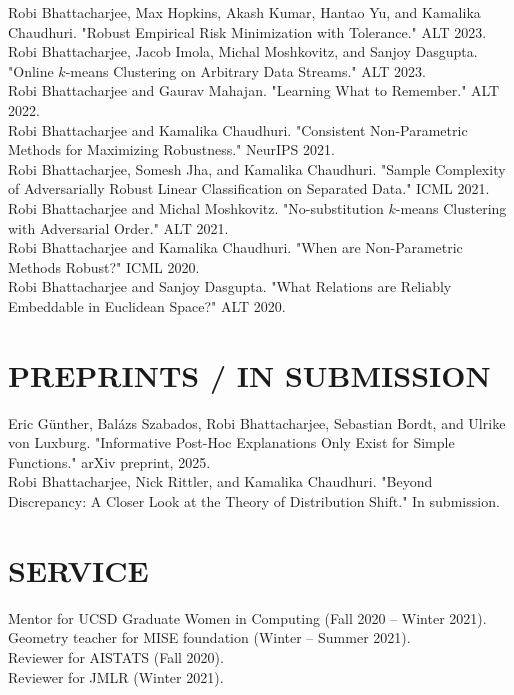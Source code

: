 \documentclass{res}
\begin{document}
\begin{resume}
Robi Bhattacharjee, Max Hopkins, Akash Kumar, Hantao Yu, and Kamalika Chaudhuri. "Robust Empirical Risk Minimization with Tolerance." ALT 2023. \\

Robi Bhattacharjee, Jacob Imola, Michal Moshkovitz, and Sanjoy Dasgupta. "Online $k$-means Clustering on Arbitrary Data Streams." ALT 2023. \\

Robi Bhattacharjee and Gaurav Mahajan. "Learning What to Remember." ALT 2022. \\

Robi Bhattacharjee and Kamalika Chaudhuri. "Consistent Non-Parametric Methods for Maximizing Robustness." NeurIPS 2021. \\

Robi Bhattacharjee, Somesh Jha, and Kamalika Chaudhuri. "Sample Complexity of Adversarially Robust Linear Classification on Separated Data." ICML 2021. \\

Robi Bhattacharjee and Michal Moshkovitz. "No-substitution $k$-means Clustering with Adversarial Order." ALT 2021. \\

Robi Bhattacharjee and Kamalika Chaudhuri. "When are Non-Parametric Methods Robust?" ICML 2020. \\

Robi Bhattacharjee and Sanjoy Dasgupta. "What Relations are Reliably Embeddable in Euclidean Space?" ALT 2020. \\

\section{PREPRINTS / IN SUBMISSION}

Eric Günther, Balázs Szabados, Robi Bhattacharjee, Sebastian Bordt, and Ulrike von Luxburg. "Informative Post-Hoc Explanations Only Exist for Simple Functions." arXiv preprint, 2025. \\

Robi Bhattacharjee, Nick Rittler, and Kamalika Chaudhuri. "Beyond Discrepancy: A Closer Look at the Theory of Distribution Shift." In submission. \\

\section{SERVICE}
Mentor for UCSD Graduate Women in Computing (Fall 2020 – Winter 2021).\\
Geometry teacher for MISE foundation (Winter – Summer 2021).\\
Reviewer for AISTATS (Fall 2020).\\
Reviewer for JMLR (Winter 2021).  


\end{resume}
\end{document}
